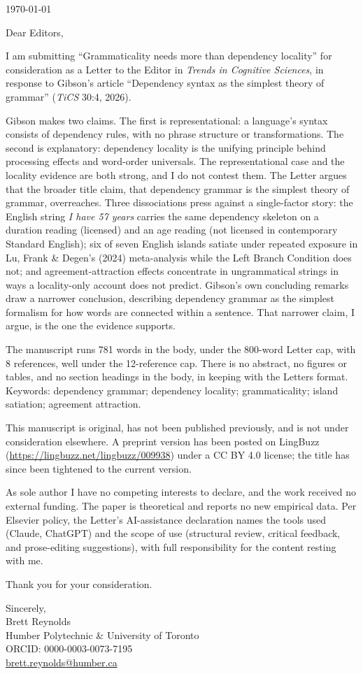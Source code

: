 \documentclass[12pt]{article}
\begin{document}
\thispagestyle{empty}

\noindent\today

\bigskip

\noindent Dear Editors,

\medskip

I am submitting \enquote{Grammaticality needs more than dependency locality} for consideration as a Letter to the Editor in \textit{Trends in Cognitive Sciences}, in response to Gibson's article \enquote{Dependency syntax as the simplest theory of grammar} (\textit{TiCS} 30:4, 2026).

Gibson makes two claims. The first is representational: a language's syntax consists of dependency rules, with no phrase structure or transformations. The second is explanatory: dependency locality is the unifying principle behind processing effects and word-order universals. The representational case and the locality evidence are both strong, and I do not contest them. The Letter argues that the broader title claim, that dependency grammar is the simplest theory of grammar, overreaches. Three dissociations press against a single-factor story: the English string \textit{I have 57 years} carries the same dependency skeleton on a duration reading (licensed) and an age reading (not licensed in contemporary Standard English); six of seven English islands satiate under repeated exposure in Lu, Frank \& Degen's (2024) meta-analysis while the Left Branch Condition does not; and agreement-attraction effects concentrate in ungrammatical strings in ways a locality-only account does not predict. Gibson's own concluding remarks draw a narrower conclusion, describing dependency grammar as the simplest formalism for how words are connected within a sentence. That narrower claim, I argue, is the one the evidence supports.

The manuscript runs 781 words in the body, under the 800-word Letter cap, with 8 references, well under the 12-reference cap. There is no abstract, no figures or tables, and no section headings in the body, in keeping with the Letters format. Keywords: dependency grammar; dependency locality; grammaticality; island satiation; agreement attraction.

This manuscript is original, has not been published previously, and is not under consideration elsewhere. A preprint version has been posted on LingBuzz (\url{https://lingbuzz.net/lingbuzz/009938}) under a CC BY 4.0 license; the title has since been tightened to the current version.

As sole author I have no competing interests to declare, and the work received no external funding. The paper is theoretical and reports no new empirical data. Per Elsevier policy, the Letter's AI-assistance declaration names the tools used (Claude, ChatGPT) and the scope of use (structural review, critical feedback, and prose-editing suggestions), with full responsibility for the content resting with me.

Thank you for your consideration.

\bigskip

\noindent Sincerely,\\
Brett Reynolds\\
Humber Polytechnic \& University of Toronto\\
ORCID: 0000-0003-0073-7195\\
\href{mailto:brett.reynolds@humber.ca}{brett.reynolds@humber.ca}
\end{document}
